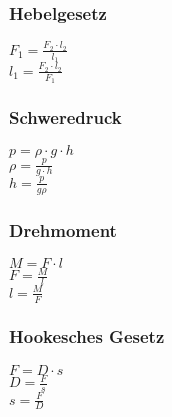 \subsubsection{Hebelgesetz} 
\begin{minipage}{0.45\textwidth} 
$ F_{1}  = \frac{F_{2} \cdot l_{2} }{ l_{1} } $\\ 
$ l_{1}  = \frac{F_{2} \cdot l_{2} }{ F_{1} } $\\ 
\end{minipage} 
\begin{minipage}{0.45\textwidth} 
 
\end{minipage} 
\subsubsection{Schweredruck} 
\begin{minipage}{0.45\textwidth} 
$ p =  \rho \cdot g\cdot h $\\ 
$ \rho  = \frac{p}{g\cdot h} $\\ 
$ h = \frac{p}{g \rho } $\\ 
\end{minipage} 
\begin{minipage}{0.45\textwidth} 
 
\end{minipage} 
\subsubsection{Drehmoment} 
\begin{minipage}{0.45\textwidth} 
$ M = F\cdot l $\\ 
$ F = \frac{M}{l} $\\ 
$ l = \frac{M}{F} $\\ 
\end{minipage} 
\begin{minipage}{0.45\textwidth} 
 
\end{minipage} 
\subsubsection{Hookesches Gesetz} 
\begin{minipage}{0.45\textwidth} 
$ F = D\cdot s $\\ 
$ D = \frac{F}{s} $\\ 
$ s = \frac{F}{D} $\\ 
\end{minipage} 
\begin{minipage}{0.45\textwidth} 
 
\end{minipage} 
